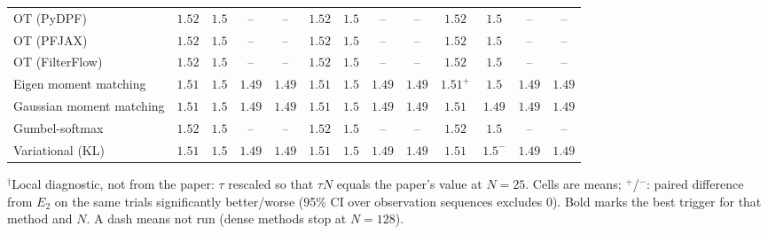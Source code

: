 \begin{table}[ht]
\begin{adjustbox}{max width=\linewidth}
\begin{tabular}{lcccc|cccc|cccc}
OT (PyDPF) & $1.52$ & $1.5$ & -- & -- & $1.52$ & $\mathbf{1.5}$ & -- & -- & $\mathbf{1.52}$ & $1.5$ & -- & -- \\
OT (PFJAX) & $1.52$ & $1.5$ & -- & -- & $1.52$ & $\mathbf{1.5}$ & -- & -- & $\mathbf{1.52}$ & $1.5$ & -- & -- \\
OT (FilterFlow) & $1.52$ & $\mathbf{1.5}$ & -- & -- & $1.52$ & $1.5$ & -- & -- & $\mathbf{1.52}$ & $1.5$ & -- & -- \\
Eigen moment matching & $1.51$ & $1.5$ & $1.49$ & $1.49$ & $1.51$ & $1.5$ & $1.49$ & $1.49$ & $\mathbf{1.51}^{+}$ & $\mathbf{1.5}$ & $\mathbf{1.49}$ & $\mathbf{1.49}$ \\
Gaussian moment matching & $\mathbf{1.51}$ & $1.5$ & $1.49$ & $1.49$ & $1.51$ & $1.5$ & $\mathbf{1.49}$ & $1.49$ & $1.51$ & $\mathbf{1.49}$ & $1.49$ & $\mathbf{1.49}$ \\
Gumbel-softmax & $1.52$ & $\mathbf{1.5}$ & -- & -- & $1.52$ & $1.5$ & -- & -- & $\mathbf{1.52}$ & $1.5$ & -- & -- \\
Variational (KL) & $1.51$ & $\mathbf{1.5}$ & $1.49$ & $\mathbf{1.49}$ & $1.51$ & $1.5$ & $\mathbf{1.49}$ & $1.49$ & $\mathbf{1.51}$ & $1.5^{-}$ & $1.49$ & $1.49$ \\
\bottomrule
\end{tabular}
\end{adjustbox}
\par\smallskip\parbox{0.95\linewidth}{\footnotesize $^\dagger$Local diagnostic, not from the paper: $\tau$ rescaled so that $\tau N$ equals the paper's value at $N{=}25$. Cells are means; $^{+}$/$^{-}$: paired difference from $E_2$ on the same trials significantly better/worse (95\% CI over observation sequences excludes 0). Bold marks the best trigger for that method and $N$. A dash means not run (dense methods stop at $N{=}128$).}
\end{table}

